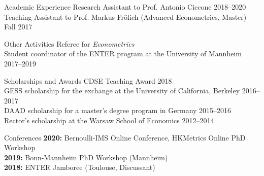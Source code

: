 \documentclass{resume} %
\begin{document}
\begin{rSection}{Academic Experience}
Research Assistant to Prof. Antonio Ciccone \hfill 2018--2020\vspace{0.1cm}
\\Teaching Assistant to Prof. Markus Fr{\"o}lich  (Advanced Econometrics, Master) \hfill Fall 2017
\end{rSection}


\begin{rSection}{Other Activities}
Referee for \textit{Econometrics} \vspace{0.1cm}
\\Student coordinator of the ENTER program at the University of Mannheim \hfill 2017--2019
\end{rSection}



\newpage


\begin{rSection}{Scholarships and Awards}
	CDSE Teaching Award \hfill 2018\vspace{0.1cm}
	\\GESS scholarship for the exchange at the University of California, Berkeley \hfill 2016--2017\vspace{0.1cm}
	\\DAAD scholarship for a master's degree program in Germany \hfill 2015--2016\vspace{0.1cm}
	\\Rector's scholarship at the Warsaw School of Economics \hfill 2012--2014
\end{rSection}



\begin{rSection}{Conferences}
\textbf{2020:} Bernoulli-IMS Online Conference, HKMetrics Online PhD Workshop\vspace{0.1cm}
\\ \textbf{2019:} Bonn-Mannheim PhD Workshop (Mannheim)\vspace{0.1cm}
\\ \textbf{2018:} ENTER Jamboree (Toulouse, Discussant)
\end{rSection}
\end{document}
